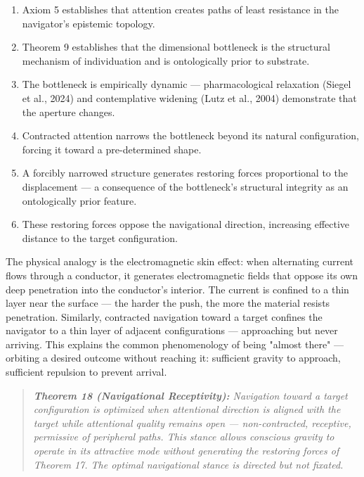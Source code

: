 \begin{enumerate}[nosep,leftmargin=*]
  \item Axiom 5 establishes that attention creates paths of least resistance in the navigator's epistemic topology.
  \item Theorem 9 establishes that the dimensional bottleneck is the structural mechanism of individuation and is ontologically prior to substrate.
  \item The bottleneck is empirically dynamic — pharmacological relaxation (Siegel et al., 2024) and contemplative widening (Lutz et al., 2004) demonstrate that the aperture changes.
  \item Contracted attention narrows the bottleneck beyond its natural configuration, forcing it toward a pre-determined shape.
  \item A forcibly narrowed structure generates restoring forces proportional to the displacement — a consequence of the bottleneck's structural integrity as an ontologically prior feature.
  \item These restoring forces oppose the navigational direction, increasing effective distance to the target configuration.
\end{enumerate}


The physical analogy is the electromagnetic skin effect: when alternating current flows through a conductor, it generates electromagnetic fields that oppose its own deep penetration into the conductor's interior. The current is confined to a thin layer near the surface — the harder the push, the more the material resists penetration. Similarly, contracted navigation toward a target confines the navigator to a thin layer of adjacent configurations — approaching but never arriving. This explains the common phenomenology of being "almost there" — orbiting a desired outcome without reaching it: sufficient gravity to approach, sufficient repulsion to prevent arrival.


\begin{quote}
\itshape
\textbf{Theorem 18 (Navigational Receptivity):} \textit{Navigation toward a target configuration is optimized when attentional direction is aligned with the target while attentional quality remains open — non-contracted, receptive, permissive of peripheral paths. This stance allows conscious gravity to operate in its attractive mode without generating the restoring forces of Theorem 17. The optimal navigational stance is directed but not fixated.}
\end{quote}


